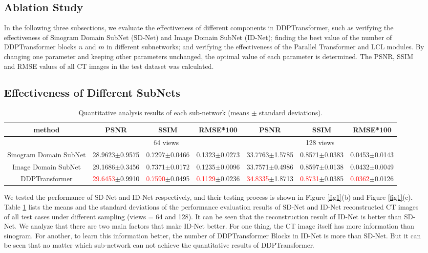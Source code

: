 \documentclass[lettersize,journal]{IEEEtran}
\begin{document}
\subsection{Ablation Study}
In the following three subsections, we evaluate the effectiveness of different components in DDPTransformer, such as verifying the effectiveness of Sinogram Domain SubNet (SD-Net) and Image Domain SubNet (ID-Net); finding the best value of the number of DDPTransformer blocks $n$ and $m$ in different subnetworks; and verifying the effectiveness of the Parallel Transformer and LCL modules. By changing one parameter and keeping other parameters unchanged, the optimal value of each parameter is determined. The PSNR, SSIM and RMSE values of all CT images in the test dataset was calculated.

\subsection{Effectiveness of Different SubNets}
\begin{table}[!t]
	\caption{Quantitative analysis results of each sub-network (means $\pm$ standard deviations).\label{tab2}}
	\centering
	\begin{tabular}{cccc|ccc}
		\hline
		method & PSNR & SSIM & RMSE*100 & PSNR & SSIM& RMSE*100 \\
		\hline  
		& \multicolumn{3}{c|}{64 views} & \multicolumn{3}{c}{128 views} \\
		\hline
		Sinogram Domain SubNet 
		& 28.9623$\pm$0.9575
		& 0.7297$\pm$0.0466
		& 0.1323$\pm$0.0273
		& 33.7763$\pm$1.5785
		& 0.8571$\pm$0.0383
		& 0.0453$\pm$0.0143 \\
		Image Domain SubNet 
		& 29.1686$\pm$0.3456
		& 0.7371$\pm$0.0172
		& 0.1235$\pm$0.0096
		& 33.7571$\pm$0.4986
		& 0.8597$\pm$0.0138
		& 0.0432$\pm$0.0049 \\
		DDPTransformer
		& \textcolor{red}{29.6453}$\pm$0.9910
		& \textcolor{red}{0.7590}$\pm$0.0495
		& \textcolor{red}{0.1129}$\pm$0.0236
		& \textcolor{red}{34.8335}$\pm$1.8713
		& \textcolor{red}{0.8731}$\pm$0.0385
		& \textcolor{red}{0.0362}$\pm$0.0126 \\ 
		\hline
	\end{tabular}
\end{table}

We tested the performance of SD-Net and ID-Net respectively, and their testing process is shown in Figure \ref{fig1}(b) and Figure \ref{fig1}(c). Table \ref{tab2} lists the means and the standard deviations of the performance evaluation results of SD-Net and ID-Net reconstructed CT images of all test cases under different sampling (views = 64 and 128). It can be seen that the reconstruction result of ID-Net is better than SD-Net. We analyze that there are two main factors that make ID-Net better. For one thing, the CT image itself has more information than sinogram. For another, to learn this information better, the number of DDPTransformer Blocks in ID-Net is more than SD-Net. But it can be seen that no matter which sub-network can not achieve the quantitative results of DDPTransformer.
\end{document}
